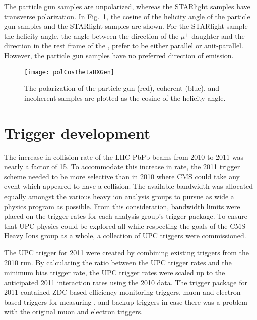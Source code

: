    The particle gun samples are unpolarized, whereas the STARlight samples 
      have transverse polarization.
    In Fig.~\ref{fig:genHXAngle}, the cosine of the helicity angle of the particle 
      gun samples and the STARlight samples are shown.
    For the STARlight sample the helicity angle, the angle between the 
      direction of the $\mu^{+}$ daughter and the \JPsi{} direction in the rest
      frame of the \JPsi{}, prefer to be either parallel or anit-parallel.
    However, the particle gun samples have no preferred direction of emission.

    \begin{figure}[!Hhbt]
      \centering
      \texttt{[image: polCosThetaHXGen]}
      \caption{ The \JPsi{} polarization of the particle gun (red),
        coherent (blue), and incoherent samples are plotted as the
        cosine of the helicity angle.} 
      \label{fig:genHXAngle}
    \end{figure}
    
  \section{\label{sec:TrigDev} Trigger development} 
    The increase in collision rate of the LHC PbPb beams from 2010 to 2011 was
      nearly a factor of 15. 
    To accommodate this increase in rate, the 2011 trigger scheme needed to be 
      more selective than in 2010 where CMS could take any event which 
      appeared to have a collision.
    The available bandwidth was allocated equally amongst the various heavy ion
      analysis groups to pursue as wide a physics program as possible.
    From this consideration, bandwidth limits were placed on the trigger rates
      for each analysis group's trigger package. 
    To ensure that UPC physics could be explored all while respecting the
      goals of the CMS Heavy Ions group as a whole, a collection of UPC triggers
      were commissioned. 
  
    The UPC trigger for 2011 were created by combining existing triggers from 
      the 2010 run. 
    By calculating the ratio between the UPC trigger rates and the minimum bias
      trigger rate, the UPC trigger rates were scaled up to the anticipated 2011 
      interaction rates using the 2010 data.
    The trigger package for 2011 contained ZDC based efficiency monitoring 
      triggers, muon and electron based triggers for measuring \JPsi{}, and 
      backup triggers in case there was a problem with the original muon and 
      electron triggers.

